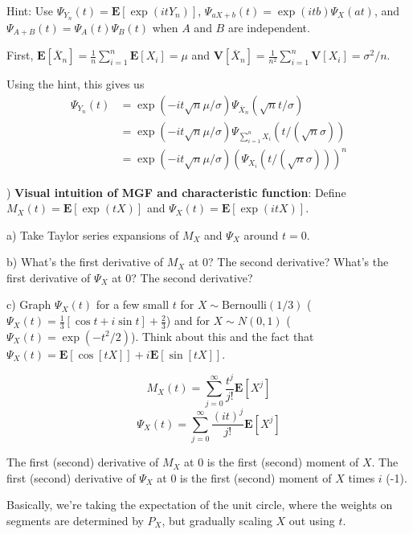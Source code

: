 \documentclass[12pt,english]{article}
\begin{document}
Hint: Use $\Psi_{Y_{n}}(t) = \mathbf{E}[\exp(itY_{n})]$, $\Psi_{aX + b}(t) = \exp(itb) \Psi_{X}(at)$, and $\Psi_{A + B}(t) = \Psi_{A}(t) \Psi_{B}(t)$ when $A$ and $B$ are independent.
\vspace{1em}

First, $\mathbf{E}[\overline{X}_{n}] = \frac{1}{n} \sum_{i=1}^{n} \mathbf{E}[X_{i}] = \mu$ and $\mathbf{V}[\overline{X}_{n}] = \frac{1}{n^{2}} \sum_{i=1}^{n} \mathbf{V}[X_{i}] = \sigma^{2} / n$.

Using the hint, this gives us
\begin{align*}
\Psi_{Y_{n}}(t) & = \exp(-it\sqrt{n}\mu/\sigma) \Psi_{\overline{X}_{n}}(\sqrt{n} t / \sigma) \\
& = \exp(-it\sqrt{n}\mu/\sigma) \Psi_{\sum_{i=1}^{n} X_{i}}(t / (\sqrt{n}\sigma)) \\
& = \exp(-it\sqrt{n}\mu/\sigma) \left( \Psi_{X_{i}}(t / (\sqrt{n}\sigma)) \right)^{n}
\end{align*}

\vspace{1em}
) \textbf{Visual intuition of MGF and characteristic function}: Define $M_{X}(t) = \mathbf{E}[\exp(tX)]$ and $\Psi_{X}(t) = \mathbf{E}[\exp(itX)]$.

\noindent
a) Take Taylor series expansions of $M_{X}$ and $\Psi_{X}$ around $t = 0$.

\noindent
b) What's the first derivative of $M_{X}$ at 0? The second derivative? What's the first derivative of $\Psi_{X}$ at 0? The second derivative?

\noindent
c) Graph $\Psi_{X}(t)$ for a few small $t$ for $X \sim \text{Bernoulli}(1/3)$ ($\Psi_{X}(t) = \frac{1}{3}[\cos t + i \sin t] + \frac{2}{3}$) and for $X \sim N(0, 1)$ ($\Psi_{X}(t) = \exp(-t^{2}/2)$). Think about this and the fact that $\Psi_{X}(t) = \mathbf{E}[\cos[tX]] + i \mathbf{E}[\sin[tX]]$.
\vspace{1em}

$$ M_{X}(t) = \sum_{j=0}^{\infty} \frac{t^{j}}{j!} \mathbf{E}[X^{j}] $$
$$ \Psi_{X}(t) = \sum_{j=0}^{\infty} \frac{(it)^{j}}{j!} \mathbf{E}[X^{j}] $$

The first (second) derivative of $M_{X}$ at 0 is the first (second) moment of $X$. The first (second) derivative of $\Psi_{X}$ at 0 is the first (second) moment of $X$ times $i$ (-1).

Basically, we're taking the expectation of the unit circle, where the weights on segments are determined by $P_{X}$, but gradually scaling $X$ out using $t$.
\end{document}
